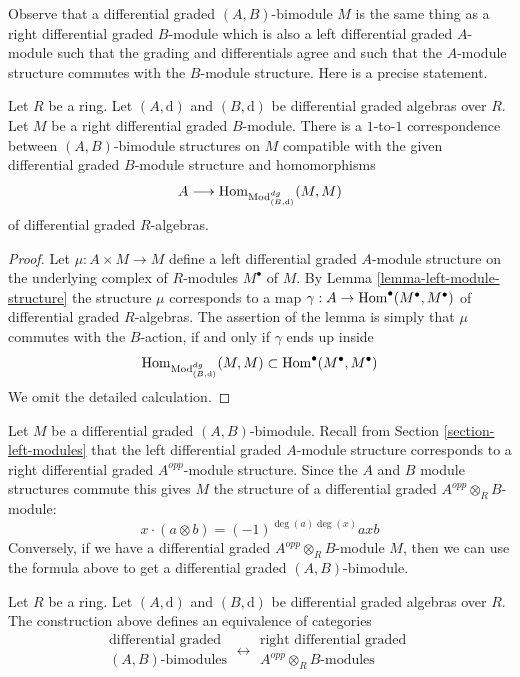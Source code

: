 \noindent
Observe that a differential graded $(A, B)$-bimodule
$M$ is the same thing as a right differential graded
$B$-module which is also a left differential graded
$A$-module such that the grading and differentials agree
and such that the $A$-module structure commutes with
the $B$-module structure. Here is a precise statement.

\begin{lemma}
\label{lemma-what-makes-a-bimodule-dg}
Let $R$ be a ring. Let $(A, \text{d})$ and $(B, \text{d})$ be
differential graded algebras over $R$. Let $M$ be a right differential
graded $B$-module. There is a $1$-to-$1$ correspondence
between $(A, B)$-bimodule structures on $M$ compatible with the given
differential graded $B$-module structure and homomorphisms
$$
A
\longrightarrow
\mathop{\mathrm{Hom}}\nolimits_{\text{Mod}^{dg}_{(B, \text{d})}}(M, M)
$$
of differential graded $R$-algebras.
\end{lemma}

\begin{proof}
Let $\mu : A \times M \to M$ define a left differential graded $A$-module
structure on the underlying complex of $R$-modules $M^\bullet$ of $M$.
By Lemma \ref{lemma-left-module-structure} the structure $\mu$ corresponds
to a map $\gamma : A \to \mathop{\mathrm{Hom}}\nolimits^\bullet(M^\bullet, M^\bullet)$
of differential graded $R$-algebras. The assertion of the lemma is simply
that $\mu$ commutes with the $B$-action, if and only if $\gamma$ ends
up inside
$$
\mathop{\mathrm{Hom}}\nolimits_{\text{Mod}^{dg}_{(B, \text{d})}}(M, M) \subset
\mathop{\mathrm{Hom}}\nolimits^\bullet(M^\bullet, M^\bullet)
$$
We omit the detailed calculation.
\end{proof}

\noindent
Let $M$ be a differential graded $(A, B)$-bimodule. Recall from
Section \ref{section-left-modules} that the left differential graded
$A$-module structure corresponds to a right differential graded
$A^{opp}$-module structure. Since the $A$ and $B$ module structures
commute this gives $M$ the structure of a differential graded
$A^{opp} \otimes_R B$-module:
$$
x \cdot (a \otimes b) = (-1)^{\deg(a)\deg(x)} axb
$$
Conversely, if we have a differential graded $A^{opp} \otimes_R B$-module
$M$, then we can use the formula above to get a differential graded
$(A, B)$-bimodule.

\begin{lemma}
\label{lemma-bimodule-over-tensor}
Let $R$ be a ring. Let $(A, \text{d})$ and $(B, \text{d})$
be differential graded algebras over $R$. The construction above
defines an equivalence of categories
$$
\begin{matrix}
\text{differential graded}\\
(A, B)\text{-bimodules}
\end{matrix}
\longleftrightarrow
\begin{matrix}
\text{right differential graded }\\
A^{opp} \otimes_R B\text{-modules}
\end{matrix}
$$
\end{lemma}

